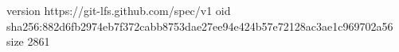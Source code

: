 version https://git-lfs.github.com/spec/v1
oid sha256:882d6fb2974eb7f372cabb8753dae27ee94e424b57e72128ac3ae1c969702a56
size 2861
